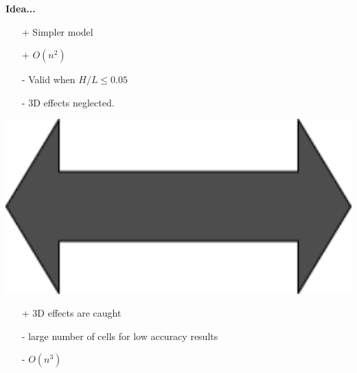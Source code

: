 \begin{frame}
{\Large \textbf{Idea...}}\\[1.5cm]
\hspace{1cm}
\begin{minipage}{0.35\textwidth}
\begin{tcolorbox}[
colframe=TUMDarkBlue,
colback=white,
title = \centering Shallow Water Equations\\2D] 
\begin{itemize}
\setlength\itemsep{1em}
\item[+] Simpler model 
\item[+] $O(n^2)$
\item[-] Valid when $H/L \leq 0.05$ 
\item[-] 3D effects neglected. \vspace{0.5cm}
\end{itemize}
\end{tcolorbox}    
\end{minipage}
\begin{minipage}{0.15\textwidth}
\hspace{0.5cm}
\includegraphics[width=1\textwidth]{Resources/Images/arrow4.png}\\
\end{minipage}
\begin{minipage}{0.35\textwidth}
\begin{tcolorbox} [
colframe=TUMOrange,
colback=white,
title = \centering Navier-Stokes\\3D]     
\begin{itemize}
\setlength\itemsep{1em}
\item[+] 3D effects are caught
\item[-] large number of cells for low accuracy results
\item[-] $O(n^3)$\vspace{0.6cm}
\end{itemize}
\end{tcolorbox}    
\end{minipage}
\end{frame}



